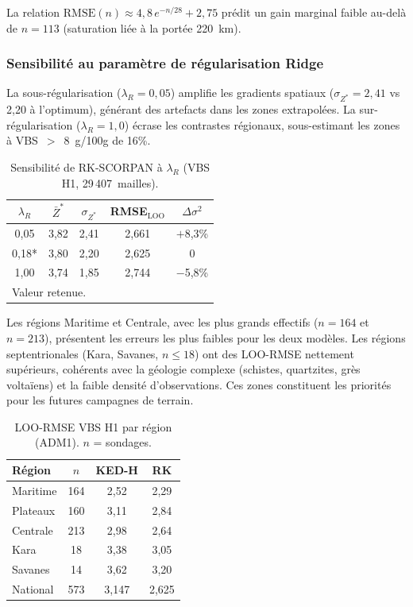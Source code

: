 \documentclass[10pt,a4paper,twocolumn]{article}
\begin{document}
La relation $\mathrm{RMSE}(n) \approx 4{,}8\,e^{-n/28}+2{,}75$ prédit
un gain marginal faible au-delà de $n=113$ (saturation liée à la portée 220~km).

\subsubsection{Sensibilité au paramètre de régularisation Ridge}

La sous-régularisation ($\lambda_R = 0{,}05$) amplifie les gradients spatiaux
($\sigma_{Z^*} = 2{,}41$ vs 2{,}20 à l'optimum), générant des artefacts dans
les zones extrapolées. La sur-régularisation ($\lambda_R = 1{,}0$) écrase
les contrastes régionaux, sous-estimant les zones à VBS~$>$~8~g/100g de 16\%.

\begin{table}[htbp]
\centering\small
\caption{Sensibilité de RK-SCORPAN à $\lambda_R$ (VBS H1, 29\,407~mailles).}
\label{tab:sensibilite_ridge}
\begin{tabular}{ccccc}
\toprule
$\lambda_R$ & $\bar{Z}^*$ & $\sigma_{Z^*}$ & RMSE$_\mathrm{LOO}$ & $\Delta\sigma^2$ \\
\midrule
0,05    & 3,82 & 2,41 & 2,661 & $+$8,3\% \\
0,18*   & 3,80 & 2,20 & 2,625 & 0 \\
1,00    & 3,74 & 1,85 & 2,744 & $-$5,8\% \\
\bottomrule
\multicolumn{5}{l}{\small * Valeur retenue.}
\end{tabular}
\end{table}

Les régions Maritime et Centrale, avec les plus grands effectifs ($n=164$ et
$n=213$), présentent les erreurs les plus faibles pour les deux modèles.
Les régions septentrionales (Kara, Savanes, $n \leq 18$) ont des LOO-RMSE
nettement supérieurs, cohérents avec la géologie complexe (schistes, quartzites,
grès voltaïens) et la faible densité d'observations. Ces zones constituent les
priorités pour les futures campagnes de terrain.

\begin{table}[htbp]
\centering\small
\caption{LOO-RMSE VBS H1 par région (ADM1). $n$ = sondages.}
\label{tab:perf_region}
\begin{tabular}{lccc}
\toprule
Région & $n$ & KED-H & RK \\
\midrule
Maritime    & 164 & 2,52 & 2,29 \\
Plateaux    & 160 & 3,11 & 2,84 \\
Centrale    & 213 & 2,98 & 2,64 \\
Kara        & 18  & 3,38 & 3,05 \\
Savanes     & 14  & 3,62 & 3,20 \\
National    & 573 & 3,147& 2,625 \\
\bottomrule
\end{tabular}
\end{table}
\end{document}
